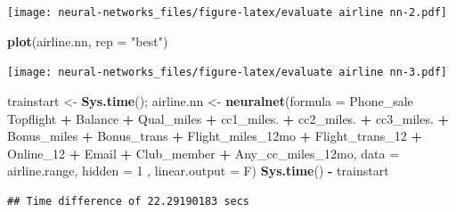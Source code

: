 \documentclass[]{article}
\newenvironment{Shaded}{\begin{snugshade}}{\end{snugshade}}
\newcommand{\KeywordTok}[1]{\textcolor[rgb]{0.13,0.29,0.53}{\textbf{#1}}}
\newcommand{\DataTypeTok}[1]{\textcolor[rgb]{0.13,0.29,0.53}{#1}}
\newcommand{\DecValTok}[1]{\textcolor[rgb]{0.00,0.00,0.81}{#1}}
\newcommand{\StringTok}[1]{\textcolor[rgb]{0.31,0.60,0.02}{#1}}
\newcommand{\OperatorTok}[1]{\textcolor[rgb]{0.81,0.36,0.00}{\textbf{#1}}}
\newcommand{\NormalTok}[1]{#1}
\begin{document}
\texttt{[image: neural-networks\_files/figure-latex/evaluate airline nn-2.pdf]}

\begin{Shaded}
\begin{Highlighting}[]
\KeywordTok{plot}\NormalTok{(airline.nn, }\DataTypeTok{rep =} \StringTok{"best"}\NormalTok{)}
\end{Highlighting}
\end{Shaded}

\texttt{[image: neural-networks\_files/figure-latex/evaluate airline nn-3.pdf]}

\begin{Shaded}
\begin{Highlighting}[]
\NormalTok{trainstart <-}\StringTok{ }\KeywordTok{Sys.time}\NormalTok{();}
\NormalTok{airline.nn <-}\StringTok{ }\KeywordTok{neuralnet}\NormalTok{(}\DataTypeTok{formula =}\NormalTok{ Phone_sale }\OperatorTok{~}\StringTok{ }\NormalTok{Topflight }\OperatorTok{+}\StringTok{ }\NormalTok{Balance }\OperatorTok{+}\StringTok{ }\NormalTok{Qual_miles }\OperatorTok{+}\StringTok{ }\NormalTok{cc1_miles. }\OperatorTok{+}\StringTok{ }\NormalTok{cc2_miles. }\OperatorTok{+}\StringTok{ }\NormalTok{cc3_miles. }\OperatorTok{+}\StringTok{ }\NormalTok{Bonus_miles }\OperatorTok{+}\StringTok{ }\NormalTok{Bonus_trans }\OperatorTok{+}\StringTok{ }\NormalTok{Flight_miles_12mo }\OperatorTok{+}\StringTok{ }\NormalTok{Flight_trans_}\DecValTok{12} \OperatorTok{+}\StringTok{ }\NormalTok{Online_}\DecValTok{12} \OperatorTok{+}\StringTok{ }\NormalTok{Email }\OperatorTok{+}\StringTok{ }\NormalTok{Club_member }\OperatorTok{+}\StringTok{ }\NormalTok{Any_cc_miles_12mo, }\DataTypeTok{data =}\NormalTok{ airline.range, }\DataTypeTok{hidden =} \DecValTok{1}\NormalTok{ , }\DataTypeTok{linear.output =}\NormalTok{ F)}
\KeywordTok{Sys.time}\NormalTok{() }\OperatorTok{-}\StringTok{ }\NormalTok{trainstart}
\end{Highlighting}
\end{Shaded}

\begin{verbatim}
## Time difference of 22.29190183 secs
\end{verbatim}
\end{document}
